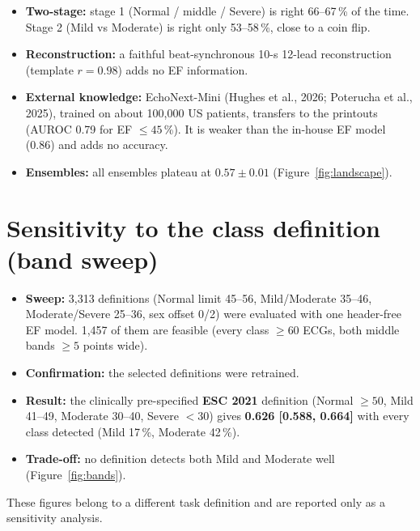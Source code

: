 \begin{itemize}
  \item \textbf{Two-stage:} stage 1 (Normal / middle / Severe) is right 66--67\,\% of the time. Stage 2 (Mild vs
    Moderate) is right only 53--58\,\%, close to a coin flip.
  \item \textbf{Reconstruction:} a faithful beat-synchronous 10-s 12-lead reconstruction (template $r=0.98$) adds
    no EF information.
  \item \textbf{External knowledge:} EchoNext-Mini (Hughes et al., 2026; Poterucha et al., 2025), trained on about
    100,000 US patients, transfers to the printouts (AUROC 0.79 for EF $\le 45$\,\%). It is weaker than the in-house
    EF model (0.86) and adds no accuracy.
  \item \textbf{Ensembles:} all ensembles plateau at $0.57\pm0.01$ (Figure~\ref{fig:landscape}).
\end{itemize}

\section{Sensitivity to the class definition (band sweep)}\label{sec:bands}
\begin{itemize}
  \item \textbf{Sweep:} 3,313 definitions (Normal limit 45--56, Mild/Moderate 35--46, Moderate/Severe 25--36, sex
    offset 0/2) were evaluated with one header-free EF model. 1,457 of them are feasible (every class $\ge 60$
    ECGs, both middle bands $\ge 5$ points wide).
  \item \textbf{Confirmation:} the selected definitions were retrained.
  \item \textbf{Result:} the clinically pre-specified \textbf{ESC 2021} definition (Normal $\ge 50$, Mild 41--49,
    Moderate 30--40, Severe $<30$) gives \textbf{0.626 [0.588, 0.664]} with every class detected (Mild 17\,\%,
    Moderate 42\,\%).
  \item \textbf{Trade-off:} no definition detects both Mild and Moderate well (Figure~\ref{fig:bands}).
\end{itemize}
These figures belong to a different task definition and are reported only as a sensitivity analysis.

